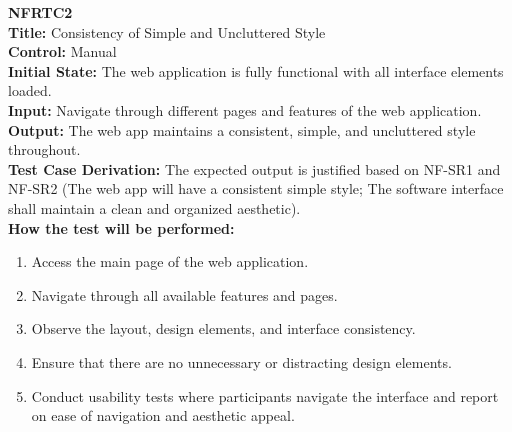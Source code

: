 \documentclass[12pt, titlepage]{article}
\begin{document}
\textbf{NFRTC2}\\
\textbf{Title:} Consistency of Simple and Uncluttered Style\\
\textbf{Control:} Manual\\
\textbf{Initial State:} The web application is fully functional with all interface elements loaded.\\
\textbf{Input:} Navigate through different pages and features of the web application.\\
\textbf{Output:} The web app maintains a consistent, simple, and uncluttered style throughout.\\
\textbf{Test Case Derivation:} The expected output is justified based on NF-SR1 and NF-SR2 (The web app will have a consistent simple style; The software interface shall maintain a clean and organized aesthetic).\\
\textbf{How the test will be performed:}
\begin{enumerate}
  \item Access the main page of the web application.
  \item Navigate through all available features and pages.
  \item Observe the layout, design elements, and interface consistency.
  \item Ensure that there are no unnecessary or distracting design elements.
  \item Conduct usability tests where participants navigate the interface and report on ease of navigation and aesthetic appeal.
\end{enumerate}
\vspace{1em}
\end{document}
